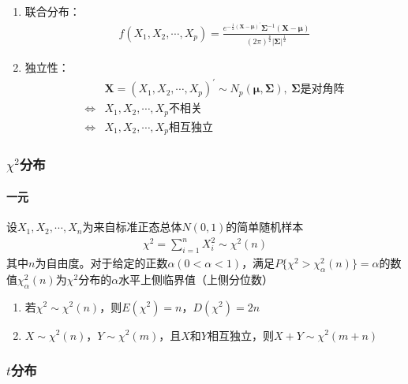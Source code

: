 \documentclass[12pt]{book}
\begin{document}
\begin{enumerate}[1.]
    \item 联合分布：
    \begin{gather*}
        f(X_1,X_2,\cdots,X_p)
        = \frac{ 
            e^{ -\frac{1}{2}(\mathbf{X}-\bm{\mu})^\prime }
            \bm{\Sigma}^{-1}
            (\bm{X}-\bm{\mu})
        }{
            (2\pi)^{\frac{p}{2}}
            \left|\mathbf{\Sigma}\right|^{\frac{1}{2}}
        }
    \end{gather*}
    \item 独立性：
    \begin{align*}
        &\mathbf{X}=(X_1,X_2,\cdots,X_p)^\prime
        \sim N_p(\bm{\mu},\bm{\Sigma}),\ \bm{\Sigma} \text{是对角阵}\\
        \Leftrightarrow &X_1,X_2,\cdots,X_p \text{不相关}\\
        \Leftrightarrow &X_1,X_2,\cdots,X_p \text{相互独立}
    \end{align*}
\end{enumerate}






\subsubsection{$\chi^2$分布}


\paragraph{一元}


设$X_1,X_2,\cdots,X_n$为来自标准正态总体$N(0,1)$的简单随机样本
\begin{gather*}
    \chi^2 = \sum_{i=1}^{n}{X_{i}^{2}}\sim \chi^{2}(n)
\end{gather*}
其中$n$为自由度。对于给定的正数$\alpha(0<\alpha<1)$，满足$P\{\chi^{2}>\chi^{2}_{\alpha}(n)\}=\alpha$的数值$\chi^{2}_{\alpha}(n)$为$\chi^2$分布的$\alpha$水平上侧临界值（上侧分位数）

\begin{enumerate}[1.]
    \item 若$\chi^2\sim\chi^2(n)$，则$E(\chi^2)=n$，$D(\chi^2)=2n$
    \item $X\sim \chi^2{(n)}$，$Y\sim\chi^2(m)$，且$X$和$Y$相互独立，则$X+Y\sim\chi^2(m+n)$
\end{enumerate}


\subsubsection{$t$分布}
\end{document}
